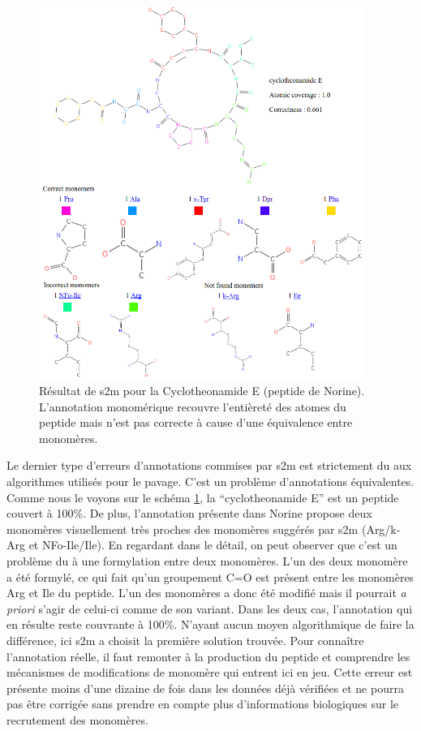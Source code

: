 \begin{figure}[h!]
  \begin{center}
    \includegraphics[width=400px]{Figures/s2m/results/cyclotheonamide.png}
    \caption{\label{cycloth}Résultat de s2m pour la Cyclotheonamide E (peptide de Norine).
    L'annotation monomérique recouvre l'entièreté des atomes du peptide mais n'est pas correcte à cause d'une équivalence entre monomères.}
  \end{center}
\end{figure}

Le dernier type d'erreurs d'annotations commises par s2m est strictement du aux algorithmes utilisés pour le pavage.
C'est un problème d'annotations équivalentes.
Comme nous le voyons sur le schéma \ref{cycloth}, la ``cyclotheonamide E'' est un peptide couvert à 100\%.
De plus, l'annotation présente dans Norine propose deux monomères visuellement très proches des monomères suggérés par s2m (Arg/k-Arg et NFo-Ile/Ile).
En regardant dans le détail, on peut observer que c'est un problème du à une formylation entre deux monomères.
L'un des deux monomère a été formylé, ce qui fait qu'un groupement C=O est présent entre les monomères Arg et Ile du peptide.
L'un des monomères a donc été modifié mais il pourrait \textit{a priori} s'agir de celui-ci comme de son variant.
Dans les deux cas, l'annotation qui en résulte reste couvrante à 100\%.
N'ayant aucun moyen algorithmique de faire la différence, ici s2m a choisit la première solution trouvée.
Pour connaître l'annotation réelle, il faut remonter à la production du peptide et comprendre les mécanismes de modifications de monomère qui entrent ici en jeu.
Cette erreur est présente moins d'une dizaine de fois dans les données déjà vérifiées et ne pourra pas être corrigée sans prendre en compte plus d'informations biologiques sur le recrutement des monomères.


